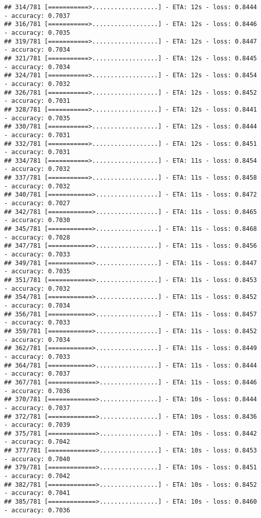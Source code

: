 \documentclass[
]{article}
\begin{document}
\begin{verbatim}
## 314/781 [===========>..................] - ETA: 12s - loss: 0.8444 - accuracy: 0.7037
## 316/781 [===========>..................] - ETA: 12s - loss: 0.8446 - accuracy: 0.7035
## 319/781 [===========>..................] - ETA: 12s - loss: 0.8447 - accuracy: 0.7034
## 321/781 [===========>..................] - ETA: 12s - loss: 0.8445 - accuracy: 0.7034
## 324/781 [===========>..................] - ETA: 12s - loss: 0.8454 - accuracy: 0.7032
## 326/781 [===========>..................] - ETA: 12s - loss: 0.8452 - accuracy: 0.7031
## 328/781 [===========>..................] - ETA: 12s - loss: 0.8441 - accuracy: 0.7035
## 330/781 [===========>..................] - ETA: 12s - loss: 0.8444 - accuracy: 0.7031
## 332/781 [===========>..................] - ETA: 12s - loss: 0.8451 - accuracy: 0.7031
## 334/781 [===========>..................] - ETA: 11s - loss: 0.8454 - accuracy: 0.7032
## 337/781 [===========>..................] - ETA: 11s - loss: 0.8458 - accuracy: 0.7032
## 340/781 [============>.................] - ETA: 11s - loss: 0.8472 - accuracy: 0.7027
## 342/781 [============>.................] - ETA: 11s - loss: 0.8465 - accuracy: 0.7030
## 345/781 [============>.................] - ETA: 11s - loss: 0.8468 - accuracy: 0.7028
## 347/781 [============>.................] - ETA: 11s - loss: 0.8456 - accuracy: 0.7033
## 349/781 [============>.................] - ETA: 11s - loss: 0.8447 - accuracy: 0.7035
## 351/781 [============>.................] - ETA: 11s - loss: 0.8453 - accuracy: 0.7032
## 354/781 [============>.................] - ETA: 11s - loss: 0.8452 - accuracy: 0.7034
## 356/781 [============>.................] - ETA: 11s - loss: 0.8457 - accuracy: 0.7033
## 359/781 [============>.................] - ETA: 11s - loss: 0.8452 - accuracy: 0.7034
## 362/781 [============>.................] - ETA: 11s - loss: 0.8449 - accuracy: 0.7033
## 364/781 [============>.................] - ETA: 11s - loss: 0.8444 - accuracy: 0.7037
## 367/781 [=============>................] - ETA: 11s - loss: 0.8446 - accuracy: 0.7036
## 370/781 [=============>................] - ETA: 10s - loss: 0.8444 - accuracy: 0.7037
## 372/781 [=============>................] - ETA: 10s - loss: 0.8436 - accuracy: 0.7039
## 375/781 [=============>................] - ETA: 10s - loss: 0.8442 - accuracy: 0.7042
## 377/781 [=============>................] - ETA: 10s - loss: 0.8453 - accuracy: 0.7040
## 379/781 [=============>................] - ETA: 10s - loss: 0.8451 - accuracy: 0.7042
## 382/781 [=============>................] - ETA: 10s - loss: 0.8452 - accuracy: 0.7041
## 385/781 [=============>................] - ETA: 10s - loss: 0.8460 - accuracy: 0.7036

\end{verbatim}
\end{document}
